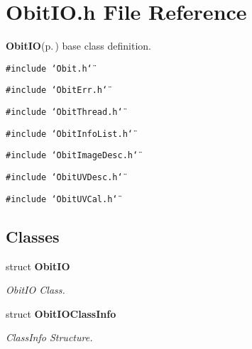 \section{Obit\-IO.h File Reference}
\label{ObitIO_8h}
{\bf Obit\-IO}{\rm (p.\,\pageref{structObitIO})} base class definition. 

{\tt \#include \char`\"{}Obit.h\char`\"{}}\par
{\tt \#include \char`\"{}Obit\-Err.h\char`\"{}}\par
{\tt \#include \char`\"{}Obit\-Thread.h\char`\"{}}\par
{\tt \#include \char`\"{}Obit\-Info\-List.h\char`\"{}}\par
{\tt \#include \char`\"{}Obit\-Image\-Desc.h\char`\"{}}\par
{\tt \#include \char`\"{}Obit\-UVDesc.h\char`\"{}}\par
{\tt \#include \char`\"{}Obit\-UVCal.h\char`\"{}}\par
\subsection*{Classes}
\begin{CompactItemize}
\item 
struct {\bf Obit\-IO}
\begin{CompactList}\small\item\em Obit\-IO Class. \item\end{CompactList}\item 
struct {\bf Obit\-IOClass\-Info}
\begin{CompactList}\small\item\em Class\-Info Structure. \item\end{CompactList}\end{CompactItemize}
